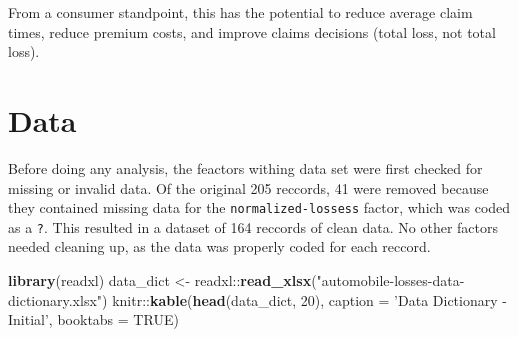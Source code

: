 \documentclass[12pt,]{book}
\newenvironment{Shaded}{\begin{snugshade}}{\end{snugshade}}
\newcommand{\KeywordTok}[1]{\textcolor[rgb]{0.13,0.29,0.53}{\textbf{{#1}}}}
\newcommand{\DataTypeTok}[1]{\textcolor[rgb]{0.13,0.29,0.53}{{#1}}}
\newcommand{\DecValTok}[1]{\textcolor[rgb]{0.00,0.00,0.81}{{#1}}}
\newcommand{\StringTok}[1]{\textcolor[rgb]{0.31,0.60,0.02}{{#1}}}
\newcommand{\OtherTok}[1]{\textcolor[rgb]{0.56,0.35,0.01}{{#1}}}
\newcommand{\NormalTok}[1]{{#1}}
\theoremstyle{definition}
\theoremstyle{definition}
\theoremstyle{remark}
\begin{document}
From a consumer standpoint, this has the potential to reduce average
claim times, reduce premium costs, and improve claims decisions (total
loss, not total loss).

\chapter{Data}\label{data}

Before doing any analysis, the feactors withing data set were first
checked for missing or invalid data. Of the original 205 reccords, 41
were removed because they contained missing data for the
\texttt{normalized-lossess} factor, which was coded as a \texttt{?}.
This resulted in a dataset of 164 reccords of clean data. No other
factors needed cleaning up, as the data was properly coded for each
reccord.

\begin{Shaded}
\begin{Highlighting}[]
\KeywordTok{library}\NormalTok{(readxl)}
\NormalTok{data_dict <-}\StringTok{ }\NormalTok{readxl::}\KeywordTok{read_xlsx}\NormalTok{(}\StringTok{"automobile-losses-data-dictionary.xlsx"}\NormalTok{)}
\NormalTok{knitr::}\KeywordTok{kable}\NormalTok{(}\KeywordTok{head}\NormalTok{(data_dict, }\DecValTok{20}\NormalTok{), }\DataTypeTok{caption =} \StringTok{'Data Dictionary - Initial'}\NormalTok{, }\DataTypeTok{booktabs =} \OtherTok{TRUE}\NormalTok{)}
\end{Highlighting}
\end{Shaded}
\end{document}
